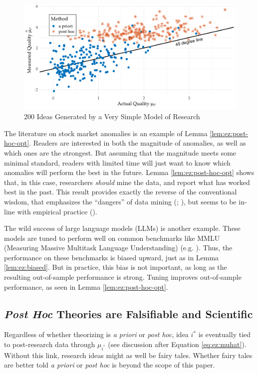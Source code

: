 \documentclass[12pt,english]{article}
\theoremstyle{plain}
\theoremstyle{plain}
\begin{document}
\begin{figure}[htbp]
    \centering
    \includegraphics[width=\textwidth]{../Results/simple-scatter.pdf}
    \caption{200 Ideas Generated by a Very Simple Model of Research}
    \label{fig:ez}
\end{figure}


The literature on stock market anomalies is an example of Lemma \ref{lem:ez:post-hoc-opt}. Readers are interested in both the magnitude of anomalies, as well as which ones are the strongest.  But assuming that the magnitude meets some minimal standard, readers with limited time will just want to know which anomalies will perform the best in the future. Lemma \ref{lem:ez:post-hoc-opt} shows that, in this case, researchers \emph{should} mine the data, and report what has worked best in the past. This result provides exactly the reverse of the conventional wisdom, that emphasizes the ``dangers'' of data mining (\citealt{sullivan1999data}; \citealt{harvey2016and}), but seems to be in-line with empirical practice (\citealt{chen2024does}).

The wild success of large language models (LLMs) is another example. These models are tuned to perform well on common benchmarks like MMLU (Measuring Massive Multitask Language Understanding) (e.g. \citet{guo2025deepseek}). Thus, the performance on these benchmarks is biased upward, just as in Lemma \ref{lem:ez:biased}. But in practice, this bias is not important, as long as the resulting out-of-sample performance is strong. Tuning improves out-of-sample performance, as seen in Lemma \ref{lem:ez:post-hoc-opt}. 


\subsection{\emph{Post Hoc} Theories are Falsifiable and Scientific}

Regardless of whether theorizing is \emph{a priori} or \emph{post hoc}, idea $i^\ast$ is eventually tied to post-research data through $\mu_{i^\ast}$ (see discussion after Equation \eqref{eq:ez:muhat}). Without this link, research ideas might as well be fairy tales. Whether fairy tales are better told \emph{a priori} or \emph{post hoc} is beyond the scope of this paper.
\end{document}
